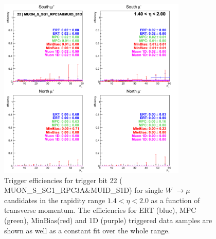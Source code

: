 \begin{figure}[h!]

  \centering

  \includegraphics[width=0.8\textwidth]{./figures/run13_trigeffipt_eta1_trig22_lin.png}
  \caption{\label{fig:run13_trigeffipt_eta1_nper0_trig22_lin} Trigger efficiencies for trigger bit 22 ( MUON\_S\_SG1\_RPC3A\&MUID\_S1D) for single $W$ $\rightarrow \mu$ candidates in the rapidity range $ 1.4 < \eta < 2.0$ as a function of transverse momentum. The efficiencies for ERT (blue), MPC (green), MinBias(red) and 1D (purple) triggered data samples are shown as well as a constant fit over the whole range.}

\end{figure}
\clearpage
